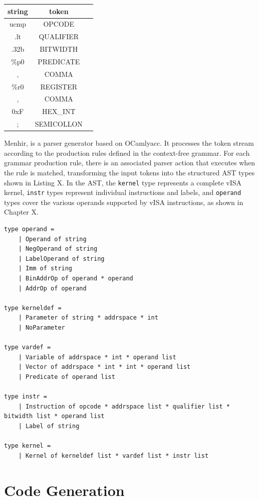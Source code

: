 \begin{center}
\begin{tabular}{ |c|c|c| } 
 \hline
 \textbf{string} & \textbf{token} \\ 
 \hline
 ucmp & OPCODE \\ 
 \hline
 .lt & QUALIFIER \\
 \hline
 .32b & BITWIDTH \\
 \hline
 \%p0 & PREDICATE \\
 \hline
 , & COMMA \\
 \hline
 \%r0 & REGISTER \\
 \hline
 , & COMMA \\
 \hline
 0xF & HEX\_INT \\
 \hline
 ; & SEMICOLLON \\
 \hline
\end{tabular}
\end{center}

Menhir, is a parser generator based on OCamlyacc. It processes the token stream
according to the production rules defined in the context-free grammar. For each
grammar production rule, there is an associated parser action that executes
when the rule is matched, transforming the input tokens into the structured AST
types shown in Listing X. In the AST, the \texttt{kernel} type represents a
complete vISA kernel, \texttt{instr} types represent individual instructions
and labels, and \texttt{operand} types cover the various operands supported by
vISA instructions, as shown in Chapter X.


\begin{lstlisting}
type operand =
    | Operand of string
    | NegOperand of string
    | LabelOperand of string
    | Imm of string
    | BinAddrOp of operand * operand
    | AddrOp of operand

type kerneldef =
    | Parameter of string * addrspace * int
    | NoParameter

type vardef =
    | Variable of addrspace * int * operand list
    | Vector of addrspace * int * int * operand list
    | Predicate of operand list
    
type instr = 
    | Instruction of opcode * addrspace list * qualifier list * bitwidth list * operand list
    | Label of string

type kernel = 
    | Kernel of kerneldef list * vardef list * instr list
\end{lstlisting}

\section{Code Generation}

